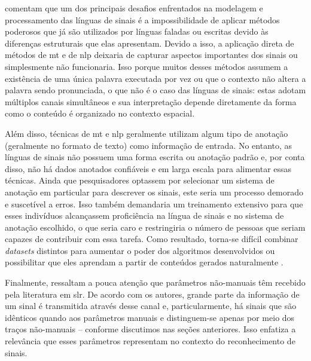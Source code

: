  comentam que um dos principais desafios enfrentados na modelagem e processamento das línguas de sinais é a impossibilidade de aplicar métodos poderosos que já são utilizados por línguas faladas ou escritas devido às diferenças estruturais que elas apresentam. Devido a isso, a aplicação direta de métodos de \acrshort{mt} e de \acrshort{nlp} deixaria de capturar aspectos importantes dos sinais ou simplesmente não funcionaria. Isso porque muitos desses métodos assumem a existência de uma única palavra executada por vez ou que o contexto não altera a palavra sendo pronunciada, o que não é o caso das línguas de sinais: estas adotam múltiplos canais simultâneos e sua interpretação depende diretamente da forma como o conteúdo é organizado no contexto espacial. 

Além disso, técnicas de \acrshort{mt} e \acrshort{nlp} geralmente utilizam algum tipo de anotação (geralmente no formato de texto) como informação de entrada. No entanto, as línguas de sinais não possuem uma forma escrita ou anotação padrão e, por conta disso, não há dados anotados confiáveis e em larga escala para alimentar essas técnicas. 
Ainda que pesquisadores optassem por selecionar um sistema de anotação em particular para descrever os sinais, este seria um processo demorado e suscetível a erros. Isso também demandaria um treinamento extensivo para que esses indivíduos alcançassem proficiência na língua de sinais e no sistema de anotação escolhido, o que seria caro e restringiria o número de pessoas que seriam capazes de contribuir com essa tarefa. Como resultado, torna-se difícil combinar \textit{datasets} distintos para aumentar o poder dos algoritmos desenvolvidos ou possibilitar que eles aprendam a partir de conteúdos gerados naturalmente \cite{bragg-2019-slr-interdisciplinary}.

Finalmente,  ressaltam a pouca atenção que parâmetros não-manuais têm recebido pela literatura em \acrshort{slr}. De acordo com os autores, grande parte da informação de um sinal é transmitida através desse canal e, particularmente, há sinais que são idênticos quando aos parâmetros manuais e distinguem-se apenas por meio dos traços não-manuais -- conforme discutimos nas seções anteriores. Isso enfatiza a relevância que esses parâmetros representam no contexto do reconhecimento de sinais.







